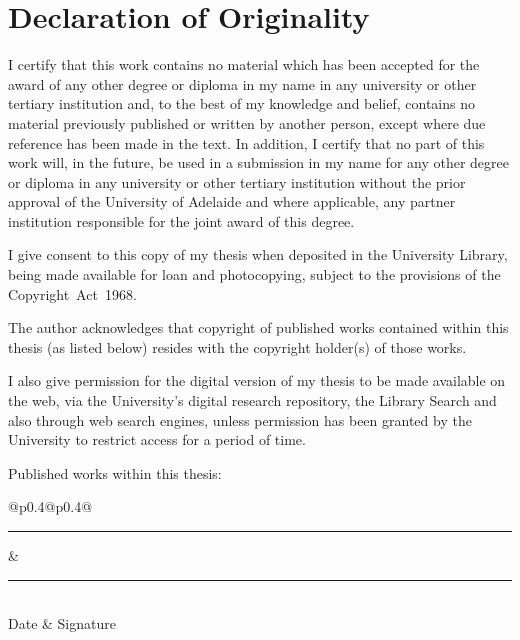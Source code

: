 \cleardoublepage
\thispagestyle{empty}
\section*{Declaration of Originality}

I certify that this work contains no material which has been accepted for the award of any other degree or diploma in my name in any university or other tertiary institution and, to the best of my knowledge and belief, contains no material previously published or written by another person, except where due reference has been made in the text. 
In addition, I certify that no part of this work will, in the future, be used in a submission in my name for any other degree or diploma in any university or other tertiary institution without the prior approval of the University of Adelaide and where applicable, any partner institution responsible for the joint award of this degree.

I give consent to this copy of my thesis when deposited in the University Library, being made available for loan and photocopying, subject to the provisions of the Copyright~Act~1968.

The author acknowledges that copyright of published works contained within this thesis (as listed below) resides with the copyright holder(s) of those works.

I also give permission for the digital version of my thesis to be made available on the web, via the University's digital research repository, the Library Search and also through web search engines, unless permission has been granted by the University to restrict access for a period of time.


\vspace{0.5cm}

Published works within this thesis:

\vspace{0.3cm}


\vspace{0.2cm}

\vspace{0.2cm}


\vspace*{1.5cm}\noindent
\begin{center}
\begin{tabular}{@{}p{0.4\textwidth}@{\hspace{0.15\textwidth}}p{0.4\textwidth}@{}}
\rule{\linewidth}{0.25pt}& \rule{\linewidth}{0.25pt}\\
Date & Signature
\end{tabular}
\end{center}
